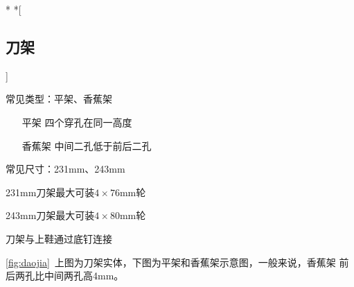 \documentclass[12pt]{ctexart}
\begin{document}
\begin{paracol}{2}
\switchcolumn[0]*
\switchcolumn[0]*[\subsection{刀架}]
\begin{intro}
  常见类型：平架、香蕉架
  \begin{itemize}[labelindent=1em, itemindent=!]
    \item[平架] 四个穿孔在同一高度
    \item[香蕉架] 中间二孔低于前后二孔
  \end{itemize}
  常见尺寸：231\si{mm}、243\si{mm}

  231\si{mm}刀架最大可装$4\times 76$\si{mm}轮

  243\si{mm}刀架最大可装$4\times 80$\si{mm}轮

  刀架与上鞋通过底钉连接
\end{intro}
\autoref{fig:daojia}~上图为刀架实体，下图为平架和香蕉架示意图，一般来说，香蕉架
前后两孔比中间两孔高\si{4mm}。


\end{paracol}
\end{document}
